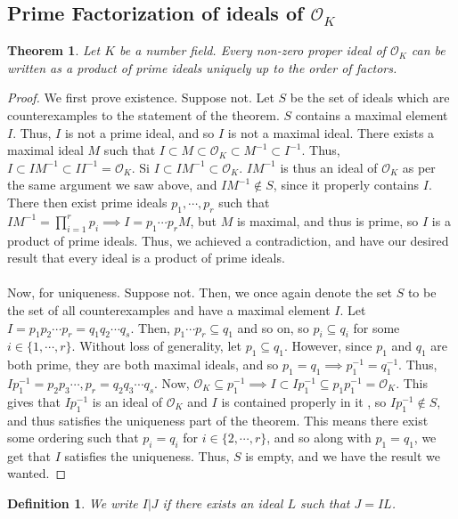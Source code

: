 \documentclass{article}
\newcommand{\air}{\mathcal{O}_K}
\newtheorem{theorem}{Theorem}[subsection]
\newtheorem{definition}{Definition}[subsection]
\begin{document}
\subsection{Prime Factorization of ideals of $\air$}
\begin{theorem}
Let $K$ be a number field. Every non-zero proper ideal of $\air$ can be written as a product of prime ideals uniquely up to the order of factors. 
\end{theorem}
\begin{proof}
We first prove existence. Suppose not. Let $S$ be the set of ideals which are counterexamples to the statement of the theorem. $S$ contains a maximal element $I$. Thus, $I$ is not a prime ideal, and so $I$ is not a maximal ideal. There exists a maximal ideal $M$ such that $I\subset M\subset \air\subset M^{-1}\subset I^{-1}$. Thus, $I\subset IM^{-1}\subset II^{-1}=\air$. Si $I\subset IM^{-1}\subset \air$. $IM^{-1}$ is thus an ideal of $\air$ as per the same argument we saw above, and $IM^{-1}\not\in S$, since it properly contains $I$. There then exist prime ideals $p_1,\cdots, p_r$ such that $IM^{-1}=\displaystyle\prod_{i=1}^r p_i\implies I=p_1\cdots p_rM$, but $M$ is maximal, and thus is prime, so $I$ is a product of prime ideals. Thus, we achieved a contradiction, and have our desired result that every ideal is a product of prime ideals.\\
\\
Now, for uniqueness. Suppose not. Then, we once again denote the set $S$ to be the set of all counterexamples and have a maximal element $I$. Let $I=p_1p_2\cdots p_r=q_1q_2\cdots q_s$. Then, $p_1\cdots p_r\subseteq q_1$ and so on, so $p_i\subseteq q_i$ for some $i\in\{1,\cdots, r\}$. 
Without loss of generality, let $p_1\subseteq q_1$. However, since $p_1$ and $q_1$ are both prime, they are both maximal ideals, and so $p_1=q_1\implies p_1^{-1}=q_1^{-1}$. Thus, $Ip_1^{-1}=p_2p_3\cdots, p_r = q_2q_3\cdots q_s$. 
Now, $\air\subseteq p_1^{-1}\implies I\subset Ip_1^{-1}\subseteq p_1p_1^{-1}=\air$. This gives that $Ip_1^{-1}$ is an ideal of $\air$ and $I$ is contained properly in it , so $Ip_1^{-1}\not\in S$, and thus satisfies the uniqueness part of the theorem. This means there exist some ordering such that $p_i=q_i$ for $i\in\{2,\cdots, r\}$, and so along with $p_1=q_1$, we get that $I$ satisfies the uniqueness. Thus, $S$ is empty, and we have the result we wanted.
\end{proof}
\begin{definition}
We write $I|J$ if there exists an ideal $L$ such that $J=IL$.
\end{definition}
\end{document}
